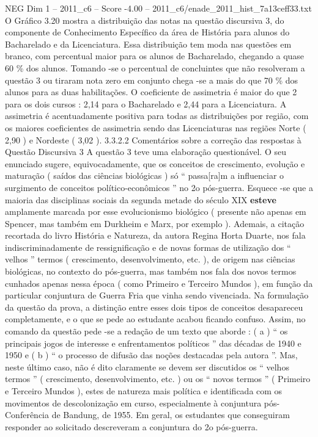 \begin{textsample}{NEG Dim 1 – 2011\_c6 – Score -4.00 – 2011\_c6/enade\_2011\_hist\_7a13ceff33.txt}
O Gráfico 3.20 mostra a distribuição das notas na questão discursiva 3, do componente de Conhecimento Específico da área de História para alunos do Bacharelado e da Licenciatura.
Essa distribuição tem moda nas questões em branco, com percentual maior para os alunos de Bacharelado, chegando a quase 60 \% dos alunos.
Tomando -se o percentual de concluintes que não resolveram a questão 3 ou tiraram nota zero em conjunto chega -se a mais do que 70 \% dos alunos para as duas habilitações.
O coeficiente de assimetria é maior do que 2 para os dois cursos : 2,14 para o Bacharelado e 2,44 para a Licenciatura.
A assimetria é acentuadamente positiva para todas as distribuições por região, com os maiores coeficientes de assimetria sendo das Licenciaturas nas regiões Norte ( 2,90 ) e Nordeste ( 3,02 ). 3.3.2.2 Comentários sobre a correção das respostas à Questão Discursiva 3 A questão 3 teve uma elaboração questionável.
O seu enunciado sugere, equivocadamente, que os conceitos de crescimento, evolução e maturação ( saídos das ciências biológicas ) só “ passa[ra]m a influenciar o surgimento de conceitos político-econômicos ” no 2o pós-guerra.
Esquece -se que a maioria das disciplinas sociais da segunda metade do século XIX \textbf{esteve} amplamente marcada por esse evolucionismo biológico ( presente não apenas em Spencer, mas também em Durkheim e Marx, por exemplo ).
Ademais, a citação recortada do livro História e Natureza, da autora Regina Horta Duarte, nos fala indiscriminadamente de ressignificação e de novas formas de utilização dos “ velhos ” termos ( crescimento, desenvolvimento, etc. ), de origem nas ciências biológicas, no contexto do pós-guerra, mas também nos fala dos novos termos cunhados apenas nessa época ( como Primeiro e Terceiro Mundos ), em função da particular conjuntura de Guerra Fria que vinha sendo vivenciada.
Na formulação da questão da prova, a distinção entre esses dois tipos de conceitos desapareceu completamente, e o que se pede ao estudante acabou ficando confuso.
Assim, no comando da questão pede -se a redação de um texto que aborde : ( a ) “ os principais jogos de interesse e enfrentamentos políticos ” das décadas de 1940 e 1950 e ( b ) “ o processo de difusão das noções destacadas pela autora ”.
Mas, neste último caso, não é dito claramente se devem ser discutidos os “ velhos termos ” ( crescimento, desenvolvimento, etc. ) ou os “ novos termos ” ( Primeiro e Terceiro Mundos ), estes de natureza mais política e identificada com os movimentos de descolonização em curso, especialmente à conjuntura pós-Conferência de Bandung, de 1955.
Em geral, os estudantes que conseguiram responder ao solicitado descreveram a conjuntura do 2o pós-guerra.

\end{textsample}
